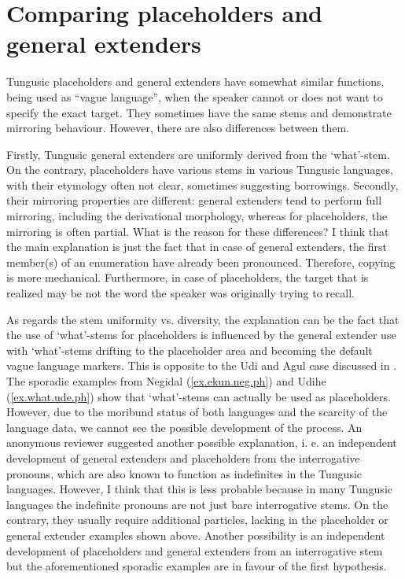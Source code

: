 \documentclass[output=paper,colorlinks,citecolor=brown
\ChapterDOI{10.5281/zenodo.15697577}
]{langscibook}
\begin{document}
\section{Comparing placeholders and general extenders}

Tungusic placeholders and general extenders have somewhat similar functions, being used as ``vague language'', when the speaker cannot or does not want to specify the exact target. They sometimes have the same stems and demonstrate mirroring behaviour. However, there are also differences between them.

Firstly, Tungusic general extenders are uniformly derived from the `what'-stem. On the contrary, placeholders have various stems in various Tungusic languages, with their etymology often not clear, sometimes suggesting borrowings. Secondly, their mirroring properties are different: general extenders tend to perform full mirroring, including the derivational morphology, whereas for placeholders, the mirroring is often partial.
What is the reason for these differences? I think that the main explanation is just the fact that in case of general extenders, the first member(s) of an enumeration have already been pronounced. Therefore, copying is more mechanical. Furthermore, in case of placeholders, the target that is realized may be not the word the speaker was originally trying to recall.

As regards the stem uniformity vs. diversity, the explanation can be the fact that the use of `what'-stems for placeholders is influenced by the general extender use with `what'-stems drifting to the placeholder area and becoming the default vague language markers. This is opposite to the Udi and Agul case discussed in \citet{ganenkov2010interrogatives}. The sporadic examples from Negidal (\ref{ex.ekun.neg.ph}) and Udihe (\ref{ex.what.ude.ph}) show that `what'-stems can actually be used as placeholders. However, due to the moribund status of both languages and the scarcity of the language data, we cannot see the possible development of the process. An anonymous reviewer suggested another possible explanation, i. e. an independent development of general extenders and placeholders from the interrogative pronouns, which are also known to function as indefinites in the Tungusic languages. However, I think that this is less probable because in many Tungusic languages the indefinite pronouns are not just bare interrogative stems. On the contrary, they usually require additional particles, lacking in the placeholder or general extender examples shown above. Another possibility is an independent development of placeholders and general extenders from an interrogative stem but the aforementioned sporadic examples are in favour of the first hypothesis.
\end{document}
